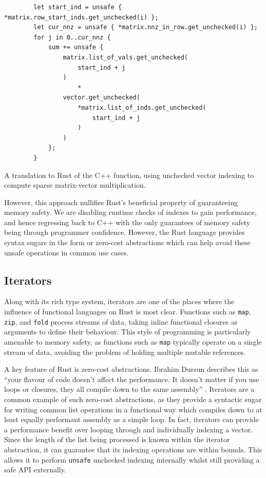 \begin{code}
    \begin{verbatim}
        let start_ind = unsafe { *matrix.row_start_inds.get_unchecked(i) };
        let cur_nnz = unsafe { *matrix.nnz_in_row.get_unchecked(i) };
        for j in 0..cur_nnz {
            sum += unsafe {
                matrix.list_of_vals.get_unchecked(
                    start_ind + j
                )
                    *
                vector.get_unchecked(
                    *matrix.list_of_inds.get_unchecked(
                        start_ind + j
                    )
                )
            };
        }
    \end{verbatim}
    \caption{A translation to Rust of the C++ function, using unchecked vector indexing to compute sparse matrix-vector multiplication.}
    \label{listing:rust-sparsemv-unchecked}
\end{code}

However, this approach nullifies Rust's beneficial property of guaranteeing memory safety. We are disabling runtime checks of indexes to gain performance, and hence regressing back to C++ with the only guarantees of memory safety being through programmer confidence. However, the Rust language provides syntax sugars in the form or zero-cost abstractions which can help avoid these unsafe operations in common use cases.

\subsection{Iterators}
\label{sec:translation-iterators}

Along with its rich type system, iterators are one of the places where the influence of functional languages on Rust is most clear. Functions such as \texttt{map}, \texttt{zip}, and \texttt{fold} process streams of data, taking inline functional closures as arguments to define their behaviour. This style of programming is particularly amenable to memory safety, as functions such as \texttt{map} typically operate on a single stream of data, avoiding the problem of holding multiple mutable references.

A key feature of Rust is zero-cost abstractions. Ibrahim Dursun describes this as ``your flavour of code doesn’t affect the performance. It doesn’t matter if you use loops or closures, they all compile down to the same assembly'' \cite{RustZeroCost2020}. Iterators are a common example of such zero-cost abstractions, as they provide a syntactic sugar for writing common list operations in a functional way which compiles down to at least equally performant assembly as a simple loop. In fact, iterators can provide a performance benefit over looping through and individually indexing a vector. Since the length of the list being processed is known within the iterator abstraction, it can guarantee that its indexing operations are within bounds. This allows it to perform \texttt{unsafe} unchecked indexing internally whilst still providing a safe API externally.

